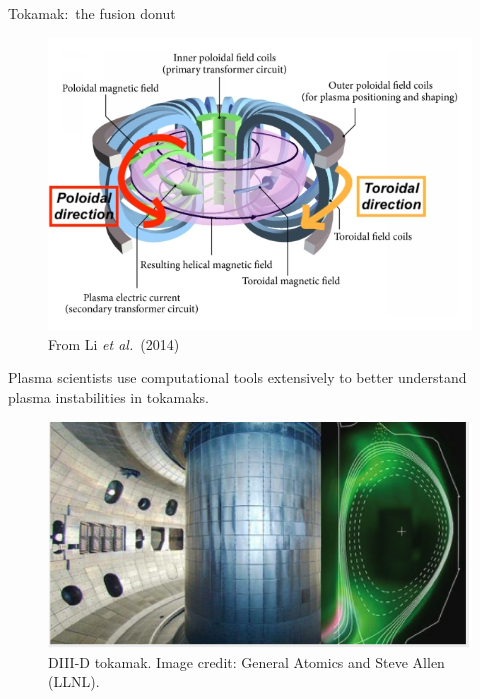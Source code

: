 \documentclass[12pt,table]{beamer}
\newcommand{\etal}{\emph{et al.}}
\begin{document}
\begin{frame}{Tokamak:~the fusion donut}
\begin{minipage}{.6\linewidth}
    \begin{figure}
        \centering
        \includegraphics[width=\linewidth]{figs/tokamak.jpg} \\
        \tiny From Li \etal\ (2014)
        \label{fig:my_label}
    \end{figure}
    Plasma scientists use computational tools extensively to better understand plasma instabilities in tokamaks. 
\end{minipage}
\begin{minipage}{.35\linewidth}
\begin{figure}
    \centering
    \includegraphics[width=1.2\linewidth]{figs/diii-d.png}\\
    \tiny DIII-D tokamak. Image credit: General Atomics and Steve Allen (LLNL).
\end{figure}%

\end{minipage}
\end{frame}
\end{document}
